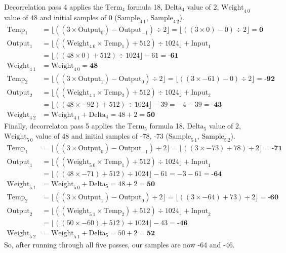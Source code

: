 Decorrelation pass 4 applies the $\text{Term}_4$ formula 18,
$\text{Delta}_4$ value of 2, $\text{Weight}_{4~0}$ value of 48
and initial samples of 0 ($\text{Sample}_{4~1}$, $\text{Sample}_{4~2}$).
\begin{align*}
\text{Temp}_1 &= \lfloor ((3 \times \text{Output}_0) - \text{Output}_{-1}) \div 2 \rfloor = \lfloor ((3 \times 0) - 0) \div 2 \rfloor = \textbf{0} \\
\text{Output}_1 &= \lfloor ((\text{Weight}_{4~0} \times \text{Temp}_1) + 512) \div 1024 \rfloor + \text{Input}_1 \\
&= \lfloor ((48 \times 0) + 512) \div 1024 \rfloor - 61 = \textbf{-61} \\
\text{Weight}_{4~1} &= \text{Weight}_{4~0} = \textbf{48} \\
\text{Temp}_2 &= \lfloor ((3 \times \text{Output}_1) - \text{Output}_0) \div 2 \rfloor = \lfloor ((3 \times -61) - 0) \div 2 \rfloor = \textbf{-92} \\
\text{Output}_2 &= \lfloor ((\text{Weight}_{4~1} \times \text{Temp}_2) + 512) \div 1024 \rfloor + \text{Input}_2 \\
&= \lfloor ((48 \times -92) + 512) \div 1024 \rfloor - 39 = -4 - 39 = \textbf{-43} \\
\text{Weight}_{4~2} &= \text{Weight}_{4~1} + \text{Delta}_4 = 48 + 2 = \textbf{50}
\end{align*}
Finally, decorrelaton pass 5 applies the $\text{Term}_5$ formula 18,
$\text{Delta}_5$ value of 2, $\text{Weight}_{5~0}$ value of 48
and initial samples of -78, -73 ($\text{Sample}_{5~1}$,
$\text{Sample}_{5~2}$).
\begin{align*}
\text{Temp}_1 &= \lfloor ((3 \times \text{Output}_0) - \text{Output}_{-1}) \div 2 \rfloor = \lfloor ((3 \times -73) + 78) \div 2 \rfloor = \textbf{-71} \\
\text{Output}_1 &= \lfloor ((\text{Weight}_{5~0} \times \text{Temp}_1) + 512) \div 1024 \rfloor + \text{Input}_1 \\
&= \lfloor ((48 \times -71) + 512) \div 1024 \rfloor - 61 = -3 - 61 = \textbf{-64} \\
\text{Weight}_{5~1} &= \text{Weight}_{5~0} + \text{Delta}_5 = 48 + 2 = \textbf{50} \\
\text{Temp}_2 &= \lfloor ((3 \times \text{Output}_1) - \text{Output}_0) \div 2 \rfloor = \lfloor ((3 \times -64) + 73) \div 2 \rfloor = \textbf{-60} \\
\text{Output}_2 &= \lfloor ((\text{Weight}_{5~1} \times \text{Temp}_2) + 512) \div 1024 \rfloor + \text{Input}_2 \\
&= \lfloor ((50 \times -60) + 512) \div 1024 \rfloor - 43 = \textbf{-46} \\
\text{Weight}_{5~2} &= \text{Weight}_{5~1} + \text{Delta}_5 = 50 + 2 = \textbf{52}
\end{align*}
So, after running through all five passes, our samples are now
-64 and -46.

